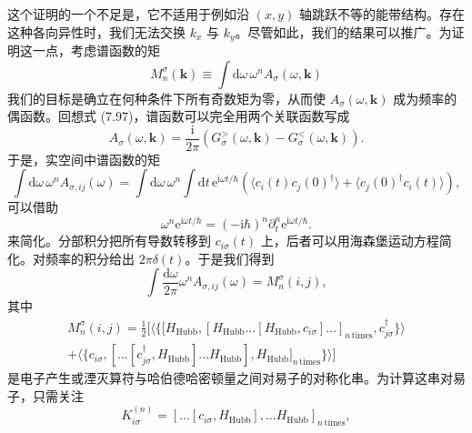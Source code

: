 这个证明的一个不足是，它不适用于例如沿 $(x,y)$ 轴跳跃不等的能带结构。存在这种各向异性时，我们无法交换 $k_{x}$ 与 $k_{y}$。尽管如此，我们的结果可以推广。为证明这一点，考虑谱函数的矩
\begin{equation*}
M^{\sigma}_{n}(\mathbf{k})\equiv\int\mathrm{d}\omega\,\omega^{n}A_{\sigma}(\omega,\mathbf{k})\tag{16.44}
\end{equation*}
我们的目标是确立在何种条件下所有奇数矩为零，从而使 $A_{\sigma}(\omega,\mathbf{k})$ 成为频率的偶函数。回想式 (7.97)，谱函数可以完全用两个关联函数写成
\begin{equation*}
A_{\sigma}(\omega,\mathbf{k})=\frac{\mathrm{i}}{2\pi}\left(G^{>}_{\sigma}(\omega,\mathbf{k})-G^{<}_{\sigma}(\omega,\mathbf{k})\right).\tag{16.45}
\end{equation*}
于是，实空间中谱函数的矩
\begin{equation*}
\int\mathrm{d}\omega\,\omega^{n}A_{\sigma,ij}(\omega)=\int\mathrm{d}\omega\,\omega^{n}\int\mathrm{d}t\,\mathrm{e}^{\mathrm{i}\omega t/\hbar}\left(\langle c_{i}(t)c_{j}(0)^{\dagger}\rangle+\langle c_{j}(0)^{\dagger}c_{i}(t)\rangle\right),\tag{16.46}
\end{equation*}
可以借助
\begin{equation*}
\omega^{n}\mathrm{e}^{\mathrm{i}\omega t/\hbar}=(-\mathrm{i}\hbar)^{n}\partial^{n}_{t}\mathrm{e}^{\mathrm{i}\omega t/\hbar}.\tag{16.47}
\end{equation*}
来简化。分部积分把所有导数转移到 $c_{i\sigma}(t)$ 上，后者可以用海森堡运动方程简化。对频率的积分给出 $2\pi\delta(t)$。于是我们得到
\begin{equation*}
\int\frac{\mathrm{d}\omega}{2\pi}\omega^{n}A_{\sigma,ij}(\omega)=M^{\sigma}_{n}(i,j),\tag{16.48}
\end{equation*}
其中
\begin{align*}
M^{\sigma}_{n}(i,j)=\frac{1}{2}\Big[\langle\{[H_{\mathrm{Hubb}},[H_{\mathrm{Hubb}}\ldots[H_{\mathrm{Hubb}},c_{i\sigma}]\ldots]_{n\,\mathrm{times}},c^{\dagger}_{j\sigma}\}\rangle\\
+\langle\{c_{i\sigma},[\ldots[c^{\dagger}_{j\sigma},H_{\mathrm{Hubb}}]\ldots H_{\mathrm{Hubb}}],H_{\mathrm{Hubb}}]_{n\,\mathrm{times}}\}\rangle\Big]\tag{16.49}
\end{align*}
是电子产生或湮灭算符与哈伯德哈密顿量之间对易子的对称化串。为计算这串对易子，只需关注
\begin{equation*}
K^{(n)}_{i\sigma}=[\ldots[c_{i\sigma},H_{\mathrm{Hubb}}],\ldots H_{\mathrm{Hubb}}]_{n\,\mathrm{times}},\tag{16.50}
\end{equation*}
